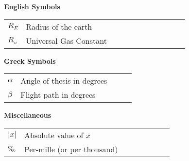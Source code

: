 
\notation
	
\begin{singlespace}
\raggedright{\textbf{English Symbols}}\\
\begin{tabular}{p{0.1\linewidth}p{0.9\linewidth}}
	\textit{$R_{E}$} & Radius of the earth\\
	$R_{u}$  & Universal Gas Constant\\
\end{tabular}

\textbf{Greek Symbols}
\begin{tabular}{p{0.1\linewidth}p{0.9\linewidth}}
	$\alpha$ & Angle of thesis in degrees \\
	$\beta$  & Flight path in degrees \\
\end{tabular} 

\textbf{Miscellaneous}\\
\begin{tabular}{p{0.1\linewidth}p{0.9\linewidth}}
	$\lvert x \rvert$  & Absolute value of $x$ \\
	$\text{\textperthousand}$   & Per-mille (or per thousand) \\
\end{tabular}

\end{singlespace}